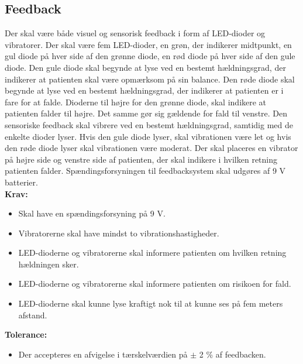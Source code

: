 \subsection{Feedback} 
Der skal være både visuel og sensorisk feedback i form af LED-dioder og vibratorer. Der skal være fem LED-dioder, en grøn, der indikerer midtpunkt, en gul diode på hver side af den grønne diode, en rød diode på hver side af den gule diode. Den gule diode skal begynde at lyse ved en bestemt hældningsgrad, der indikerer at patienten skal være opmærksom på sin balance. Den røde diode skal begynde at lyse ved en bestemt hældningsgrad, der indikerer at patienten er i fare for at falde. Dioderne til højre for den grønne diode, skal indikere at patienten falder til højre. Det samme gør sig gældende for fald til venstre. Den sensoriske feedback skal vibrere ved en bestemt hældningsgrad, samtidig med de enkelte dioder lyser. Hvis den gule diode lyser, skal vibrationen være let og hvis den røde diode lyser skal vibrationen være moderat. Der skal placeres en vibrator på højre side og venstre side af patienten, der skal indikere i hvilken retning patienten falder. Spændingsforsyningen til feedbacksystem skal udgøres af 9 V batterier. \\
\textbf{Krav:}
\begin{itemize}
\item Skal have en spændingsforsyning på 9 V.
\item Vibratorerne skal have mindst to vibrationshastigheder.
\item LED-dioderne og vibratorerne skal informere patienten om hvilken retning hældningen sker.
\item LED-dioderne og vibratorerne skal informere patienten om risikoen for fald.
\item LED-dioderne skal kunne lyse kraftigt nok til at kunne ses på fem meters afstand.
\end{itemize}
\textbf{Tolerance:}
\begin{itemize}
\item Der accepteres en afvigelse i tærskelværdien på $\pm$ 2 \% af feedbacken.
\end{itemize}
